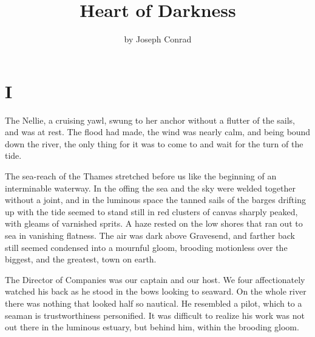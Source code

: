 \documentclass[12pt]{report}
\title{\HUGE\bfseries{Heart of Darkness}}
\author{\Large by Joseph Conrad}
\date{\vspace{-4mm} }
\newcommand{\mychapter}[2]{
\setcounter{chapter}{#1}
    \setcounter{section}{0}
    \chapter*{#2}
    \addcontentsline{toc}{chapter}{#2}
}
\begin{document}
\begin{titlepage}
    \maketitle
\end{titlepage}

\titlespacing{\chapter}{0mm}{-2em}{1em}
\mychapter{1}{I}
The Nellie, a cruising yawl, swung to her anchor without a flutter of
the sails, and was at rest. The flood had made, the wind was nearly
calm, and being bound down the river, the only thing for it was to come
to and wait for the turn of the tide.

The sea-reach of the Thames stretched before us like the beginning of an
interminable waterway. In the offing the sea and the sky were welded
together without a joint, and in the luminous space the tanned sails of
the barges drifting up with the tide seemed to stand still in red
clusters of canvas sharply peaked, with gleams of varnished sprits. A
haze rested on the low shores that ran out to sea in vanishing flatness.
The air was dark above Gravesend, and farther back still seemed
condensed into a mournful gloom, brooding motionless over the biggest,
and the greatest, town on earth.

The Director of Companies was our captain and our host. We four
affectionately watched his back as he stood in the bows looking to
seaward. On the whole river there was nothing that looked half so
nautical. He resembled a pilot, which to a seaman is trustworthiness
personified. It was difficult to realize his work was not out there in
the luminous estuary, but behind him, within the brooding gloom.
\end{document}

